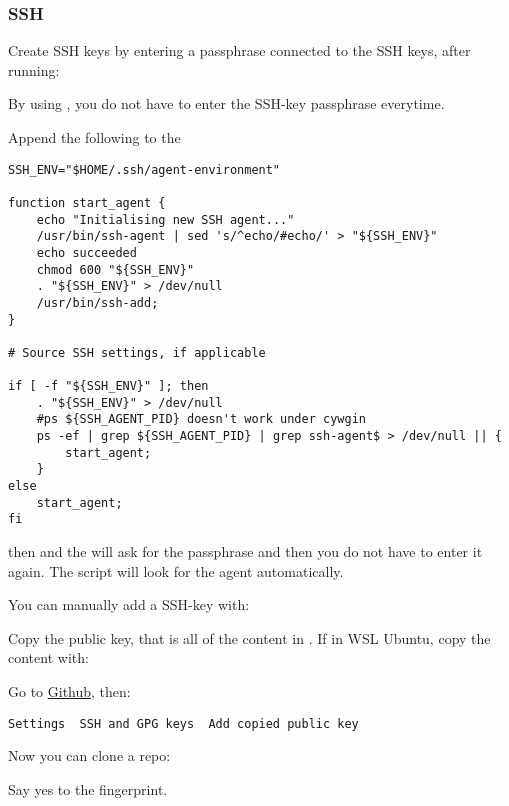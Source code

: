 \subsubsection{SSH}


Create SSH keys by entering a passphrase connected to the SSH keys, after running:



By using , you do not have to enter the SSH-key passphrase everytime.

Append the following to the 

\begin{verbatim}
SSH_ENV="$HOME/.ssh/agent-environment"

function start_agent {
    echo "Initialising new SSH agent..."
    /usr/bin/ssh-agent | sed 's/^echo/#echo/' > "${SSH_ENV}"
    echo succeeded
    chmod 600 "${SSH_ENV}"
    . "${SSH_ENV}" > /dev/null
    /usr/bin/ssh-add;
}

# Source SSH settings, if applicable

if [ -f "${SSH_ENV}" ]; then
    . "${SSH_ENV}" > /dev/null
    #ps ${SSH_AGENT_PID} doesn't work under cywgin
    ps -ef | grep ${SSH_AGENT_PID} | grep ssh-agent$ > /dev/null || {
        start_agent;
    }
else
    start_agent;
fi
\end{verbatim}

then  and the  will ask for the passphrase and then you do not have to enter it again. The script will look for the agent automatically.

You can manually add a SSH-key with:



Copy the public key, that is all of the content in . If in WSL Ubuntu, copy the content with:


Go to \href{www.github.com}{Github}, then: 

\texttt{Settings \ra\ SSH and GPG keys \ra\ Add copied public key}

Now you can clone a repo:


Say yes to the fingerprint.
